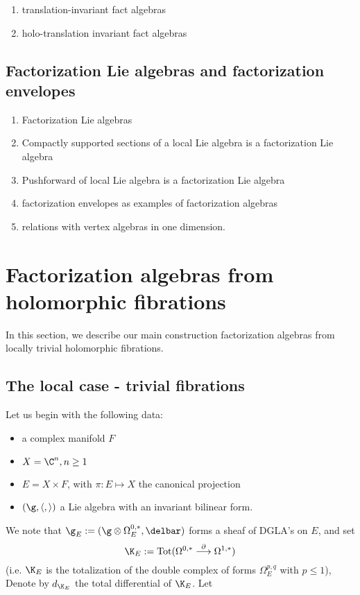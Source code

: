 \documentclass[12pt]{amsart}
\theoremstyle{definition}
\theoremstyle{remark}
\newcommand{\on}{\operatorname}
\begin{document}
\begin{enumerate}
\item {\color{red} translation-invariant fact algebras}
\item {\color{red} holo-translation invariant fact algebras}
\end{enumerate}

\subsection{Factorization Lie algebras and factorization envelopes}

\begin{enumerate}
\item Factorization Lie algebras
\item Compactly supported sections of a local Lie algebra is a factorization Lie algebra
\item Pushforward of local Lie algebra is a factorization Lie algebra
\item factorization envelopes as examples of factorization algebras
\item relations with vertex algebras in one dimension. 
\end{enumerate}

\section{Factorization algebras from holomorphic fibrations}

In this section, we describe our main construction factorization algebras from locally trivial holomorphic fibrations. 

\subsection{The local case - trivial fibrations}

Let us begin with the following data:
\begin{itemize}
\item a complex manifold $F$
\item $X = \C^n, n \geq 1$
\item $E = X \times F$, with $\pi: E \mapsto X $ the canonical projection
\item $(\g, \langle, \rangle)$ a Lie algebra with an invariant bilinear form.
\end{itemize}

We note that $\g_E := (\g \otimes \Omega^{0,*}_E, \delbar)$ forms a sheaf of DGLA's on $E$, and
set
\[
\K_E := \on{Tot} ( \Omega^{0,*} \overset{\partial}{\longrightarrow} \Omega^{1,*})
\]
(i.e. $\K_E$ is the totalization of the double complex of forms $\Omega^{p,q}_E$ with $p \leq 1$), Denote by $d_{\K_E}$ the total differential of $\K_E$. 
Let 
\end{document}
